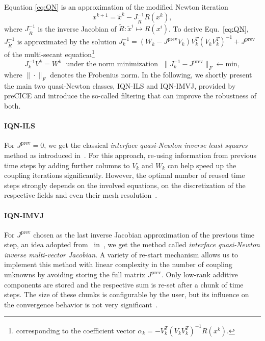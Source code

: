 Equation \eqref{eq:QN} is an approximation of the modified Newton iteration
\[ x^{k+1} = \tilde{x}^k - J_{\tilde{R}}^{-1} R(x^k), \]
where $J^{-1}_{\tilde{R}}$ is the inverse Jacobian of $\tilde{R}: \tilde{x}^i \mapsto R(x^i)$. To derive Equ.~\eqref{eq:QN}, $J^{-1}_{\tilde{R}}$ is approximated by the solution $J_k^{-1} = (W_k - J^{\text{prev}} V_k) V_k^T (V_k V_k^T)^{-1} + J^{\text{prev}}$ of the multi-secant equation\footnote{corresponding to the coefficient vector $\alpha_k = - V_k^T (V_k V_k^T)^{-1} R(x^k)$.}
\begin{equation}
J_k^{-1} V^k = W^k \; \mbox{ under the norm minimization } \; \| J_k^{-1} - J^{\text{prev}} \|_F \leftarrow \text{min}, \label{eq:multi_secant}
\end{equation}
where $\| \cdot \|_F$ denotes the Frobenius norm. In the following, we shortly present the main two quasi-Newton classes, IQN-ILS and IQN-IMVJ, provided by preCICE and introduce the so-called filtering that can improve the robustness of both. 

\paragraph{IQN-ILS} For $J^{\text{prev}}=0$, we get the classical \textit{interface quasi-Newton inverse least squares} method as introduced in~\cite{Degroote2009}. For this approach, re-using information from previous time steps by adding further columns to $V_k$ and $W_k$ can help speed up the coupling iterations significantly. However, the optimal number of reused time steps strongly depends on the involved equations, on the discretization of the respective fields and even their mesh resolution~\cite{Scheuf:QN}.

\paragraph{IQN-IMVJ} For $J^{\text{prev}}$ chosen as the last inverse Jacobian approximation of the previous time step, an idea adopted from~\cite{Bogaers2014_MVQN} in~\cite{Lindner2015_MVQN,Scheufele2015}, we get the method called \textit{interface quasi-Newton inverse multi-vector Jacobian}. A variety of re-start mechanism allows us to implement this method with linear complexity in the number of coupling unknowns by avoiding storing the full matrix $J^{\text{prev}}$. Only low-rank additive components are stored and the respective sum is re-set after a chunk of time steps. The size of these chunks is configurable by the user, but its influence on the convergence behavior is not very significant~\cite{Scheuf:QN,Scheufele2019_Diss}.

